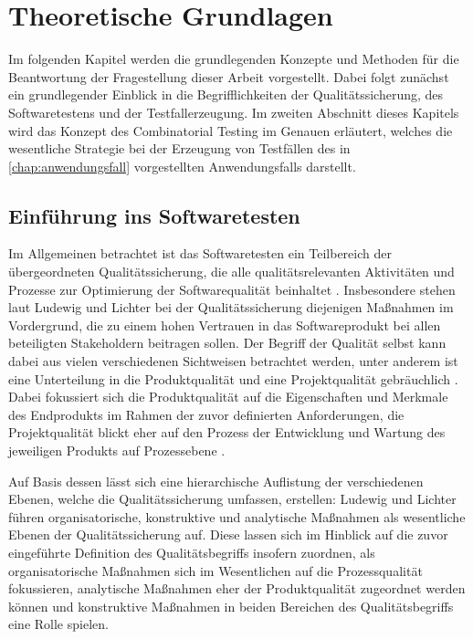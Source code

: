 \chapter{Theoretische Grundlagen}\label{chap:theorie}

Im folgenden Kapitel werden die grundlegenden Konzepte und Methoden für die Beantwortung der Fragestellung dieser Arbeit vorgestellt. Dabei folgt zunächst ein grundlegender Einblick in die Begrifflichkeiten der Qualitätssicherung, des Softwaretestens und der Testfallerzeugung. Im zweiten Abschnitt dieses Kapitels wird das Konzept des Combinatorial Testing im Genauen erläutert, welches die wesentliche Strategie bei der Erzeugung von Testfällen des in \autoref{chap:anwendungsfall} vorgestellten Anwendungsfalls darstellt.

\section{Einführung ins Softwaretesten}\label{sec:einführungTest}

Im Allgemeinen betrachtet ist das Softwaretesten ein Teilbereich der übergeordneten Qualitätssicherung, die \glqq alle qualitätsrelevanten Aktivitäten und Prozesse\grqq{} zur Optimierung der Softwarequalität beinhaltet \cite[S. 269]{ludewig2010software}. Insbesondere stehen laut Ludewig und Lichter \cite{ludewig2010software} bei der Qualitätssicherung diejenigen Maßnahmen im Vordergrund, die zu einem hohen Vertrauen in das Softwareprodukt bei allen beteiligten Stakeholdern beitragen sollen. Der Begriff der Qualität selbst kann dabei aus vielen verschiedenen Sichtweisen betrachtet werden, unter anderem ist eine Unterteilung in die Produktqualität und eine Projektqualität gebräuchlich \cite[S. 66]{ludewig2010software}. Dabei fokussiert sich die Produktqualität auf die Eigenschaften und Merkmale des Endprodukts im Rahmen der zuvor definierten Anforderungen, die Projektqualität blickt eher auf den Prozess der Entwicklung und Wartung des jeweiligen Produkts auf Prozessebene \cite[S. 66 ff.]{ludewig2010software}. 

Auf Basis dessen lässt sich eine hierarchische Auflistung der verschiedenen Ebenen, welche die Qualitätssicherung umfassen, erstellen: Ludewig und Lichter \cite[S. 271 ff.]{ludewig2010software} führen organisatorische, konstruktive und analytische Maßnahmen als wesentliche Ebenen der Qualitätssicherung auf. Diese lassen sich im Hinblick auf die zuvor eingeführte Definition des Qualitätsbegriffs insofern zuordnen, als organisatorische Maßnahmen sich im Wesentlichen auf die Prozessqualität fokussieren, analytische Maßnahmen eher der Produktqualität zugeordnet werden können und konstruktive Maßnahmen in beiden Bereichen des Qualitätsbegriffs eine Rolle spielen.

